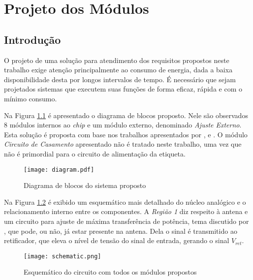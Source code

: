 \chapter{Projeto dos Módulos}\label{ProjetoDosModulos}

\section{Introdução}
O projeto de uma solução para atendimento dos requisitos propostos neste trabalho exige atenção principalmente ao consumo de energia, dada a baixa disponibilidade desta por longos intervalos de tempo. É necessário que sejam projetados sistemas que executem suas funções de forma eficaz, rápida e com o mínimo consumo.

Na Figura \ref{fig:diagram} é apresentado o diagrama de blocos proposto. Nele são observados 8 módulos internos ao \textit{chip} e um módulo externo, denominado \emph{Ajuste Externo}. Esta solução é proposta com base nos trabalhos apresentados por ,  e . O módulo \emph{Circuito de Casamento} apresentado não é tratado neste trabalho, uma vez que não é primordial para o circuito de alimentação da etiqueta.

\begin{figure}[!htb]
	\caption[Diagrama de blocos do sistema proposto]{\label{fig:diagram}Diagrama de blocos do sistema proposto}
	\begin{center}
		\texttt{[image: diagram.pdf]}
	\end{center}
\end{figure}

Na Figura \ref{fig:schematic} é exibido um esquemático mais detalhado do núcleo analógico e o relacionamento interno entre os componentes. A \emph{Região 1} diz respeito à antena e um circuito para ajuste de máxima transferência de potência, tema discutido por , que pode, ou não, já estar presente na antena. Dela o sinal é transmitido ao retificador, que eleva o nível de tensão do sinal de entrada, gerando o sinal $V_{ret}$.

\begin{figure}[!htb]
	\caption{\label{fig:schematic}Esquemático do circuito com todos os módulos propostos}
	\begin{center}
		\texttt{[image: schematic.png]}
	\end{center}
\end{figure}

